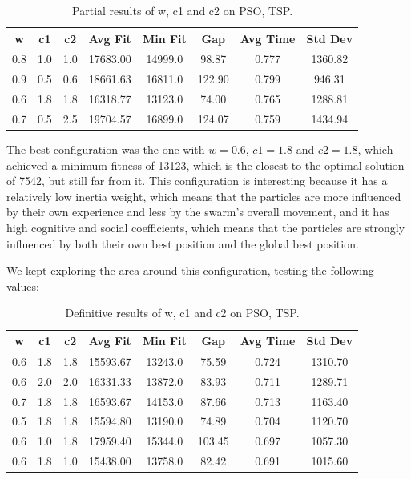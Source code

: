 \documentclass[12pt,a4paper]{article}
\begin{document}
\begin{table}[H]
        \centering
        \begin{tabular}{c c c c c c c c}
        \hline
        \textbf{w} & \textbf{c1} & \textbf{c2} & \textbf{Avg Fit} & \textbf{Min Fit} & \textbf{Gap} & \textbf{Avg Time} & \textbf{Std Dev} \\
        \hline
        0.8 & 1.0 & 1.0 & 17683.00 & 14999.0 &  98.87 & 0.777 & 1360.82\\ 
        0.9 & 0.5 & 0.6 & 18661.63 & 16811.0 & 122.90 & 0.799 & 946.31 \\
        0.6 & 1.8 & 1.8 & 16318.77 & 13123.0 & 74.00 & 0.765 & 1288.81 \\
        0.7 & 0.5 & 2.5 & 19704.57 & 16899.0 & 124.07 & 0.759 & 1434.94 \\
        \hline
        \end{tabular}
        \caption{Partial results of w, c1 and c2 on PSO, TSP.}
\end{table}

The best configuration was the one with $w=0.6$, $c1=1.8$ and $c2=1.8$, which achieved a minimum fitness of 13123, which is the closest to the optimal solution of 7542, but still far from it.
This configuration is interesting because it has a relatively low inertia weight, which means that the particles are more influenced by their own experience and less by the swarm's overall movement, and it has high cognitive and social coefficients, which means that the particles are strongly influenced by both their own best position and the global best position.

We kept exploring the area around this configuration, testing the following values:
\begin{table}[H]
        \centering
        \begin{tabular}{c c c c c c c c}
        \hline
        \textbf{w} & \textbf{c1} & \textbf{c2} & \textbf{Avg Fit} & \textbf{Min Fit} & \textbf{Gap} & \textbf{Avg Time} & \textbf{Std Dev} \\
        \hline
        0.6 & 1.8 & 1.8 & 15593.67 & 13243.0 & 75.59 & 0.724 & 1310.70\\ 
         0.6 & 2.0 & 2.0 & 16331.33 & 13872.0 & 83.93 & 0.711 & 1289.71 \\
        0.7 & 1.8 & 1.8 & 16593.67 & 14153.0 & 87.66 & 0.713 & 1163.40 \\
        0.5 & 1.8 & 1.8 & 15594.80 & 13190.0 & 74.89 & 0.704 & 1120.70 \\
        0.6 & 1.0 & 1.8 & 17959.40 & 15344.0 & 103.45 & 0.697 & 1057.30 \\
        0.6 & 1.8 & 1.0 & 15438.00 & 13758.0 & 82.42 & 0.691 & 1015.60 \\
        \hline
        \end{tabular}
        \caption{Definitive results of w, c1 and c2 on PSO, TSP.}
\end{table}
\end{document}
